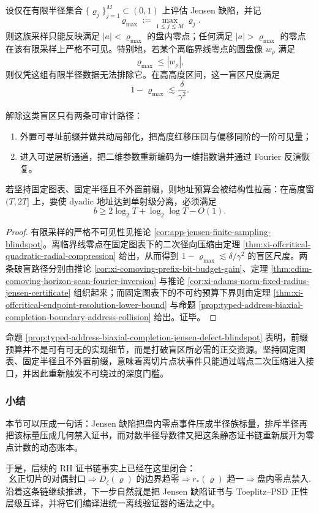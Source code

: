\begin{proposition}[有限采样盲区与可审计破盲路径]\label{prop:typed-address-biaxial-completion-jensen-defect-blindspot}
设仅在有限半径集合 \(\{\varrho_j\}_{j=1}^{M}\subset(0,1)\) 上评估 Jensen 缺陷，并记
\[
\varrho_{\max}:=\max_{1\le j\le M}\varrho_j.
\]
则这族采样只能反映满足 \(|a|<\varrho_{\max}\) 的盘内零点；任何满足 \(|a|>\varrho_{\max}\) 的零点在该有限采样上严格不可见。特别地，若某个离临界线零点的圆盘像 \(w_{\rho}\) 满足
\[
\varrho_{\max}\le |w_{\rho}|,
\]
则仅凭这组有限半径数据无法排除它。在高高度区间，这一盲区尺度满足
\[
1-\varrho_{\max}\lesssim \frac{\delta}{\gamma^2}.
\]

解除这类盲区只有两条可审计路径：
\begin{enumerate}
  \item 外置可寻址前缀并做共动局部化，把高度红移压回与偏移同阶的一阶可见量；
  \item 进入可逆层析通道，把二维参数重新编码为一维指数谱并通过 Fourier 反演恢复。
\end{enumerate}
若坚持固定图表、固定半径且不外置前缀，则地址预算会被结构性拉高：在高度窗 \((T,2T]\) 上，要使 dyadic 地址达到单射级分离，必须满足
\[
b\ge 2\log_2 T+\log_2\log T-O(1).
\]
\end{proposition}
\begin{proof}
有限采样的严格不可见性见推论 \ref{cor:app-jensen-finite-sampling-blindspot}。离临界线零点在固定图表下的二次径向压缩由定理 \ref{thm:xi-offcritical-quadratic-radial-compression} 给出，从而得到 \(1-\varrho_{\max}\lesssim \delta/\gamma^2\) 的盲区尺度。两条破盲路径分别由推论 \ref{cor:xi-comoving-prefix-bit-budget-gain}、定理 \ref{thm:cdim-comoving-horizon-scan-fourier-inversion} 与推论 \ref{cor:xi-adams-norm-fixed-radius-jensen-certificate} 组织起来；而固定图表下的不可约预算下界则由定理 \ref{thm:xi-offcritical-endpoint-resolution-lower-bound} 与命题 \ref{prop:typed-address-biaxial-completion-boundary-address-collision} 给出。证毕。
\end{proof}

命题 \ref{prop:typed-address-biaxial-completion-jensen-defect-blindspot} 表明，前缀预算并不是可有可无的实现细节，而是打破盲区所必需的正交资源。坚持固定图表、固定半径且不外置前缀，意味着离切片点状事件只能通过端点二次压缩进入接口，并因此重新触发不可绕过的深度门槛。

\subsubsection{小结}\label{subsubsec:typed-address-biaxial-completion-jensen-defect-summary}
本节可以压成一句话：Jensen 缺陷把盘内零点事件压成半径族标量，排斥半径再把该标量压成几何禁入证书，而对数半径导数律又把这条静态证书链重新展开为零点计数的动态账本。

于是，后续的 RH 证书链事实上已经在这里闭合：
\[
\text{幺正切片的对偶封口}
\Longrightarrow
D_{\zeta}(\varrho)\text{ 的边界趋零}
\Longrightarrow
r_{\ast}(\varrho)\text{ 趋一}
\Longrightarrow
\text{盘内零点禁入}.
\]
沿着这条链继续推进，下一步自然就是把 Jensen 缺陷证书与 Toeplitz--PSD 正性层级互译，并将它们编译进统一离线验证器的语法之中。
